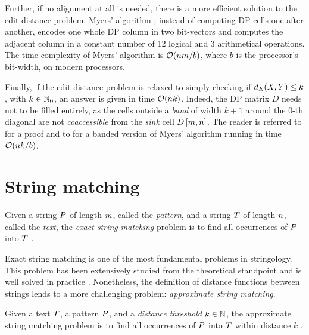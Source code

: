 Further, if no alignment at all is needed, there is a more efficient solution to the edit distance problem.
Myers' algorithm \citep{Myers1999}, instead of computing DP cells one after another, encodes one whole DP column in two bit-vectors and computes the adjacent column in a constant number of 12 logical and 3 arithmetical operations.
The time complexity of Myers' algorithm is $\mathcal{O}(nm/b)$, where $b$ is the processor's bit-width,  on modern processors.

Finally, if the edit distance problem is relaxed to simply checking if $d_E(X,Y) \leq k$, with $k \in \mathbb {N}_0$, an answer is given in time $\mathcal{O}(n k)$.
Indeed, the DP matrix $D$ needs not to be filled entirely, as the cells outside a \emph{band} of width $k+1$ around the $0$-th diagonal are not \emph{coaccessible} from the \emph{sink} cell $D\left[m,n\right]$.
The reader is referred to \citep{Siragusa2013b} for a proof and to \citep{Weese2012} for a banded version of Myers' algorithm running in time $\mathcal{O}(n k/b)$.


\section{String matching}

\begin{definition}
Given a string $P$ of length $m$, called the \emph{pattern}, and a string $T$ of length $n$, called the \emph{text}, the \emph{exact string matching} problem is to find all occurrences of $P$ into $T$ \citep{Gusfield1997}.
\end{definition}

Exact string matching is one of the most fundamental problems in stringology.
This problem has been extensively studied from the theoretical standpoint and is well solved in practice \citep{Faro2013}.
Nonetheless, the definition of distance functions between strings lends to a more challenging problem: \emph{approximate string matching}.

\begin{definition}
Given a text $T$, a pattern $P$, and a \emph{distance threshold} $k \in \mathbb {N}$, the approximate string matching problem is to find all occurrences of $P$ into $T$ within distance $k$ \citep{Galil1988}.
\end{definition}

